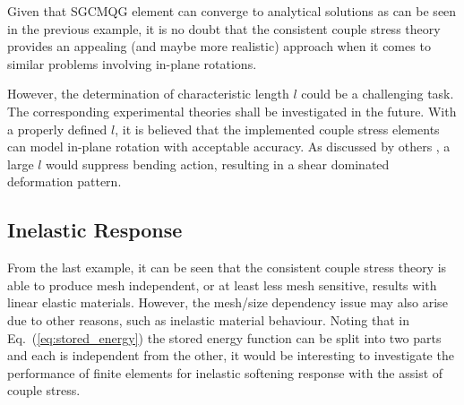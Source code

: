 \documentclass[3p,sort&compress,11pt,fleqn,review]{elsarticle}
\newcommand*{\eqsref}[1]{Eq.~(\ref{#1})}
\begin{document}
Given that SGCMQG element can converge to analytical solutions as can be seen in the previous example, it is no doubt that the consistent couple stress theory provides an appealing (and maybe more realistic) approach when it comes to similar problems involving in-plane rotations.

However, the determination of characteristic length $l$ could be a challenging task. The corresponding experimental theories shall be investigated in the future. With a properly defined $l$, it is believed that the implemented couple stress elements can model in-plane rotation with acceptable accuracy. As discussed by others \citep[e.g.,][]{Darrall2013}, a large $l$ would suppress bending action, resulting in a shear dominated deformation pattern.
\subsection{Inelastic Response}
From the last example, it can be seen that the consistent couple stress theory is able to produce mesh independent, or at least less mesh sensitive, results with linear elastic materials. However, the mesh/size dependency issue may also arise due to other reasons, such as inelastic material behaviour. Noting that in \eqsref{eq:stored_energy} the stored energy function can be split into two parts and each is independent from the other, it would be interesting to investigate the performance of finite elements for inelastic softening response with the assist of couple stress.
\end{document}
